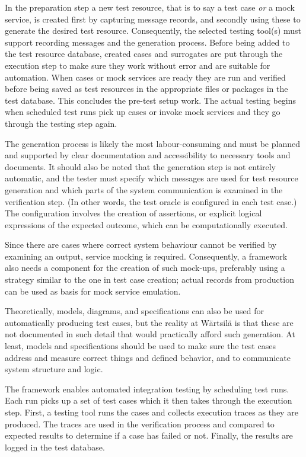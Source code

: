 \documentclass[12pt,a4paper,oneside,pdftex]{report}
\begin{document}
{%
In the preparation step a new test resource, that is to say a test case \emph{or} a mock service, is created first by capturing message records, and secondly using these to generate the desired test resource. Consequently, 
the selected testing tool(s) must support recording messages and the generation process. Before being added to the test resource database, created cases and surrogates are put through the execution step to make sure they work without error and are suitable for automation. When cases or mock services are ready they are run and verified before being saved as test resources in the appropriate files or packages in the test database. This concludes the pre-test setup work. The actual testing begins when scheduled test runs pick up cases or invoke mock services and they go through the testing step again.

The generation process is likely the most labour-consuming and must be planned and supported by clear documentation and accessibility to necessary tools and documents. It should also be noted that the generation step is not entirely automatic, and the tester must specify which messages are used for test resource generation and which parts of the system communication is examined in the verification step. (In other words, the test oracle is configured in each test case.) The configuration involves the creation of assertions, or explicit logical expressions of the expected outcome, which can be computationally executed. 

Since there are cases where correct system behaviour cannot be verified by examining an output, service mocking is required. Consequently, a framework also needs a component for the creation of such mock-ups, preferably using a strategy similar to the one in test case creation; actual records from production can be used as basis for mock service emulation.

Theoretically, models, diagrams, and specifications can also be used for automatically producing test cases, but the reality at Wärtsilä is that these are not documented in such detail that would practically afford such generation. At least, models and specifications should be used to make sure the test cases address and measure correct things and defined behavior, and to communicate system structure and logic. 

The framework enables automated integration testing by scheduling test runs. Each run picks up a set of test cases which it then takes through the execution step. First, a testing tool runs the cases and collects execution traces as they are produced. The traces are used in the verification process and compared to expected results to determine if a case has failed or not. Finally, the results are logged in the test database.

}
\end{document}
